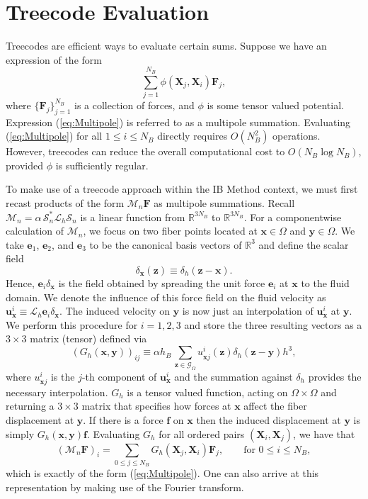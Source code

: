 \documentclass[preprint,12pt]{elsarticle}
\newcommand{\B}[1]{\mathbf{#1}}
\newcommand{\C}[1]{\mathcal{#1}}
\newcommand{\BB}[1]{\mathbb{#1}}
\begin{document}
\section{Treecode Evaluation}
\label{Sec:Treecode}
Treecodes are efficient ways to evaluate certain sums. Suppose we have an expression of the form
\begin{equation}
\sum_{j=1}^{N_B} \phi(\B{X}_j, \B{X}_i) \B{F}_j,
\label{eq:Multipole}
\end{equation}
where $\{\B{F}_j\}_{j=1}^{N_B}$ is a collection of forces, and $\phi$ is some tensor valued potential.
Expression (\ref{eq:Multipole}) is referred to as a multipole summation. Evaluating (\ref{eq:Multipole}) for all $1\leq i\leq N_B$  directly requires $O(N_B^2)$ operations. However, treecodes can reduce the overall computational cost to $O(N_B\log N_B)$, provided  $\phi$ is sufficiently regular.

To make use of a treecode approach within the IB Method context, we must first recast products of the form $\C{M}_n\B{F}$ as multipole summations. Recall $\C{M}_n =  \alpha \, \C{S}^*_n \C{L}_h \C{S}_n$ is a linear function from $\BB{R}^{3N_B}$ to $\BB{R}^{3N_B}$. For a componentwise calculation of $\C{M}_n$, we focus on two fiber points located at $\B{x}\in\Omega$ and $\B{y}\in\Omega$. We take $\B{e}_1$, $\B{e}_2$, and $\B{e}_3$ to be the canonical basis vectors of $\BB{R}^3$ and define the scalar field
\begin{equation}
\delta_{\B{x}}(\B{z}) \equiv \delta_h(\B{z} - \B{x}).
\end{equation}
Hence, $\B{e}_i\delta_{\B{x}}$ is the  field obtained by spreading the unit force $\B{e}_i$ at $\B{x}$ to the fluid domain.
We denote the influence of this force field on the fluid velocity as $\B{u}_{\B{x}}^i \equiv \C{L}_h \B{e}_i \delta_{\B{x}}$. The induced velocity on $\B{y}$ is now just an interpolation of $\B{u}_{\B{x}}^i$ at $\B{y}$. 
We perform this procedure for $i=1,2,3$ and store the three resulting vectors as a $3\times 3$ matrix (tensor) defined via
\begin{equation}
(G_h(\B{x},\B{y}))_{ij} \equiv \alpha h_B \, \sum_{\B{z} \in \C{G}_\Omega} u_{\B{x}j}^i(\B{z}) \delta_h\left(\B{z}-\B{y}\right)h^3,
\label{eq:GreensDef}
\end{equation}
where $u_{\B{x}j}^i$ is the $j$-th component of $\B{u}_{\B{x}}^i$ and
the summation against $\delta_h$ provides the necessary interpolation.
$G_h$ is a tensor valued function, acting on $\Omega\times\Omega$ and returning a $3\times 3$ matrix that specifies how forces at $\B{x}$ affect the fiber displacement at $\B{y}$. If there is a force $\B{f}$ on $\B{x}$ then the induced displacement at $\B{y}$ is simply $G_h(\B{x},\B{y})\B{f}$. Evaluating $G_h$ for all ordered pairs $\left(\B{X}_i,\B{X}_j\right)$, we have that
\begin{equation}
(\C{M}_n\B{F})_i = \sum_{0\leq j\leq N_B} G_h(\B{X}_j, \B{X}_i) \B{F}_j, \qquad\text{for $0\leq i\leq N_B$},
\end{equation}
which is exactly of the form (\ref{eq:Multipole}). One can also arrive at this representation by making use of the Fourier transform. 
\end{document}
